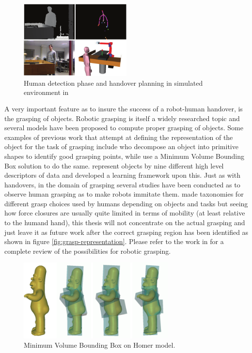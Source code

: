 \begin{figure}
	\centering
	\includegraphics[width=0.5\textwidth]{img/related-work/planning-simulation.png}
	\caption{Human detection phase and handover planning in simulated environment in \parencite{Aleotti2012}}
\end{figure}

A very important feature as to insure the success of a robot-human handover, is the grasping of objects. Robotic grasping is itself a widely researched topic and several models have been proposed to compute proper grasping of objects. Some examples of previous work that attempt at defining the representation of the object for the task of grasping include \textcite{Miller2003} who decompose an object into primitive shapes to identify good grasping points, while \textcite{Huebner2008} use a Minimum Volume Bounding Box solution to do the same. \textcite{Morales} represent objects by nine different high level descriptors of data and developed a learning framework upon this. Just as with handovers, in the domain of grasping several studies have been conducted as to observe human grasping as to make robots immitate them. \parencite{Cutkosky1990} \parencite{Feix2009} \parencite{Kang1993} made taxonomies for different grasp choices used by humans depending on objects and tasks but seeing how force closures are usually quite limited in terms of mobility (at least relative to the humand hand), this thesis will not concentrate on the actual grasping and just leave it as future work after the correct grasping region has been identified as shown in figure \ref{fig:grasp-representation}. Please refer to the work in \parencite{Sahbani2012} for a complete review of the possibilities for robotic grasping.

\begin{figure}
	\centering
	\includegraphics[width=0.7\textwidth]{img/related-work/mvbb.png}
	\caption{Minimum Volume Bounding Box on Homer model.}
\end{figure}


